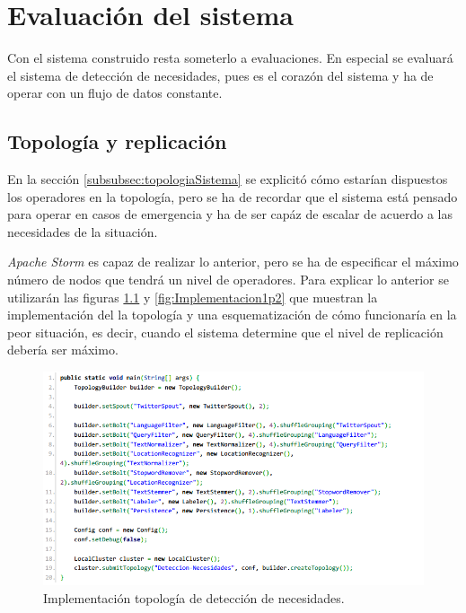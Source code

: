 \chapter{Evaluación del sistema}
\label{cap:experimentos}

Con el sistema construido resta someterlo a evaluaciones. En especial se evaluará el sistema de detección de necesidades, pues es el corazón del sistema y ha de operar con un flujo de datos constante.

\section{Topología y replicación}
\label{sec:topYPar}

En la sección \ref{subsubsec:topologiaSistema} se explicitó cómo estarían dispuestos los operadores en la topología, pero se ha de recordar que el sistema está pensado para operar en casos de emergencia y ha de ser capáz de escalar de acuerdo a las necesidades de la situación.

\textit{Apache Storm} es capaz de realizar lo anterior, pero se ha de especificar el máximo número de nodos que tendrá un nivel de operadores. Para explicar lo anterior se utilizarán las figuras \ref{fig:Implementacion1} y \ref{fig:Implementacion1p2} que muestran la implementación del la topología y una esquematización de cómo funcionaría en la peor situación, es decir, cuando el sistema determine que el nivel de replicación debería ser máximo.

\begin{figure}[H]
	\centering
	\captionsetup{justification=centering}
	\includegraphics[scale=0.8]{images/ImplementacionTopologia1.png}
	\caption[Implementación topología de detección de necesidades.]{Implementación topología de detección de necesidades.}
	\label{fig:Implementacion1}
\end{figure}

